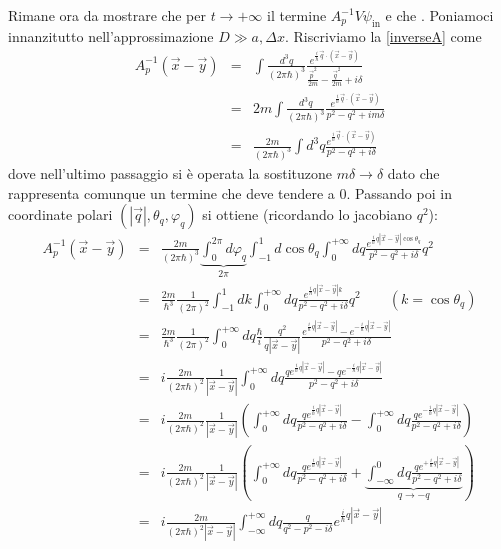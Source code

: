 \documentclass[../../FisicaTeorica.tex]{subfiles}
\begin{document}
Rimane ora da mostrare che per $t \to + \infty$ il termine $A_p^{- 1} V
\psi_{\text{in}}$ {} e che
. Poniamoci innanzitutto
nell'approssimazione $D \gg a, \Delta x$. Riscriviamo la {\eqref{inverseA}}
come
\begin{eqnarray*}
  A_p^{- 1}  (\vec{x} - \vec{y}) & = & \int \frac{d^3 q}{(2 \pi \hbar)^3} 
  \frac{e^{\frac{i}{\hbar} \vec{q} \cdot (\vec{x} -
  \vec{y})}}{\frac{\vec{p}^2}{2 m} - \frac{\vec{q}^2}{2 m} + i \delta}\\
  & = & 2 m \int \frac{d^3 q}{(2 \pi \hbar)^3}  \frac{e^{\frac{i}{\hbar}
  \vec{q} \cdot (\vec{x} - \vec{y})}}{p^2 - q^2 + im \delta}\\
  & = & \frac{2 m}{(2 \pi \hbar)^3} \int d^3 q \frac{e^{\frac{i}{\hbar}
  \vec{q} \cdot (\vec{x} - \vec{y})}}{p^2 - q^2 + i \delta}
\end{eqnarray*}
dove nell'ultimo passaggio si {\`e} operata la sostituzone $m \delta
\rightarrow \delta$ dato che rappresenta comunque un termine che deve tendere
a $0$. Passando poi in coordinate polari $(| \vec{q} |, \theta_q, \varphi_q)$
si ottiene (ricordando lo jacobiano $q^2$):
\begingroup
\allowdisplaybreaks
\begin{eqnarray*}
  A_p^{- 1}  (\vec{x} - \vec{y}) & = & \frac{2 m}{(2 \pi \hbar)^3}  \underbrace{\int_0^{2 \pi} d
  \varphi_q}_{2 \pi}  \int_{- 1}^1 d \cos \theta_q  \int_0^{+ \infty} d q
  \frac{e^{\frac{i}{\hbar} q | \vec{x} - \vec{y} | \cos \theta_q}}{p^2 - q^2 +
  i \delta} q^2\\
  & = & \frac{2 m}{\hbar^3}  \frac{1}{(2 \pi)^2}  \int_{- 1}^1 d k \int_0^{+
  \infty} d q \frac{e^{\frac{i}{\hbar} q | \vec{x} - \vec{y} | k}}{p^2 - q^2 +
  i \delta} q^2 \qquad (k = \cos \theta_q)\\
  & = & \frac{2 m}{\hbar^3}  \frac{1}{(2 \pi)^2} \int_0^{+ \infty} d q
  \frac{\hbar}{i}  \frac{q^2 }{q | \vec{x} - \vec{y} |} 
  \frac{e^{\frac{i}{\hbar} q | \vec{x} - \vec{y} |} - e^{- \frac{i}{\hbar} q |
  \vec{x} - \vec{y} |}}{p^2 - q^2 + i \delta}\\
  & = & i \frac{2 m}{(2 \pi \hbar)^2}  \frac{1}{| \vec{x} - \vec{y} |}
  \int_0^{+ \infty} d q \frac{q e^{\frac{i}{\hbar} q | \vec{x} - \vec{y} |} -
  q e^{- \frac{i}{\hbar} q | \vec{x} - \vec{y} |}}{p^2 - q^2 + i \delta}\\
  & = & i \frac{2 m}{(2 \pi \hbar)^2}  \frac{1}{| \vec{x} - \vec{y} |} \left(
  \int_0^{+ \infty} d q \frac{q e^{\frac{i}{\hbar} q | \vec{x} - \vec{y}
  |}}{p^2 - q^2 + i \delta} - \int_0^{+ \infty} d q \frac{q e^{-
  \frac{i}{\hbar} q | \vec{x} - \vec{y} |}}{p^2 - q^2 + i \delta} \right)\\
  & = & i \frac{2 m}{(2 \pi \hbar)^2}  \frac{1}{| \vec{x} - \vec{y} |} \left(
  \int_0^{+ \infty} d q \frac{q e^{\frac{i}{\hbar} q | \vec{x} - \vec{y}
  |}}{p^2 - q^2 + i \delta} + \underbrace{\int^0_{- \infty} d^{} q \frac{q
  e^{+ \frac{i}{\hbar} q | \vec{x} - \vec{y} |}}{p^2 - q^2 + i \delta}}_{q
  \rightarrow - q} \right)\\
  & = & i \frac{2 m}{(2 \pi \hbar)^2 | \vec{x} - \vec{y} |}  \int_{-
  \infty}^{+ \infty} d q \frac{q}{q^2 - p^2 - i \delta} e^{\frac{i}{\hbar} q |
  \vec{x} - \vec{y} |}
\end{eqnarray*}
\end{document}
